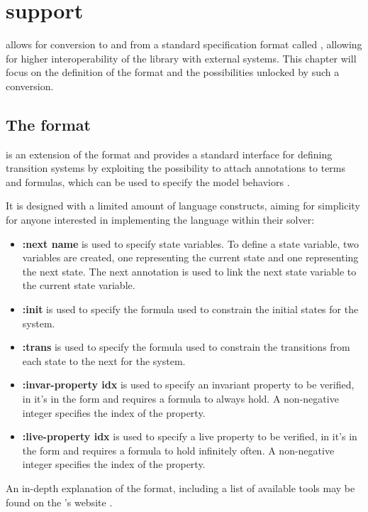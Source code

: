 \chapter{\vmtlib{} support}
\label{ch:vmtlib}
\pyvmt{} allows for conversion to and from a standard specification format called \vmtlib{}, allowing for higher interoperability of the library with external systems.
This chapter will focus on the definition of the format and the possibilities unlocked by such a conversion.

\section{The \vmtlib{} format}
\vmtlib{} is an extension of the \smtlib{} format and provides a standard interface for defining transition systems by exploiting the possibility to attach annotations to terms and formulas, which can be used to specify the model behaviors \cite{vmt-lib-paper}.

It is designed with a limited amount of language constructs, aiming for simplicity for anyone interested in implementing the language within their \vmt{} solver:
\begin{itemize}
    \item \textbf{:next name} is used to specify state variables. To define a state variable, two variables are created, one representing the current state and one representing the next state. The next annotation is used to link the next state variable to the current state variable.
    \item \textbf{:init} is used to specify the formula used to constrain the initial states for the system.
    \item \textbf{:trans} is used to specify the formula used to constrain the transitions from each state to the next for the system.
    \item \textbf{:invar-property idx} is used to specify an invariant property to be verified, in \ltl{} it's in the form \fsafe{} and requires a formula to always hold. A non-negative integer specifies the index of the property.
    \item \textbf{:live-property idx} is used to specify a live property to be verified, in \ltl{} it's in the form \flive{} and requires a formula to hold infinitely often. A non-negative integer specifies the index of the property.
\end{itemize}

An in-depth explanation of the format, including a list of available tools may be found on the \vmtlib{}'s website \cite{VMT-LIB}.

